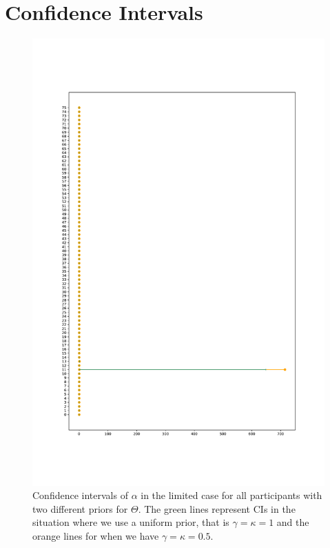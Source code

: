 \chapter{Confidence Intervals}
\label{appendix_CIs}
\begin{figure}
    \centering
    \includegraphics[scale=0.36]{pictures/Sensitivity/ci_lim_alpha_pdf.pdf}
    \caption[CIs for $\alpha$ in the limited case]{Confidence intervals of $\alpha$ in the limited case for all participants with two different priors for $\Theta$. The green lines represent CIs in the situation where we use a uniform prior, that is $\gamma=\kappa=1$ and the orange lines for when we have $\gamma=\kappa=0.5$.}
    \label{fig:sensitivity_cis_lim_alpha}
\end{figure}


